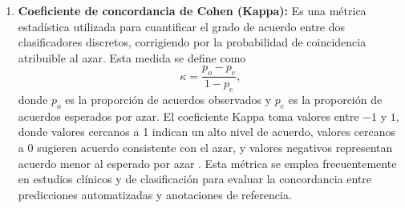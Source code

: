 \begin{enumerate}
    \item \textbf{Coeficiente de concordancia de Cohen (Kappa):} Es una métrica estadística utilizada para cuantificar el grado de acuerdo entre dos clasificadores discretos, corrigiendo por la probabilidad de coincidencia atribuible al azar. Esta medida se define como
    \[
        \kappa = \frac{p_o - p_e}{1 - p_e},
    \]
    donde \(p_o\) es la proporción de acuerdos observados y \(p_e\) es la proporción de acuerdos esperados por azar. El coeficiente Kappa toma valores entre \(-1\) y \(1\), donde valores cercanos a 1 indican un alto nivel de acuerdo, valores cercanos a $0$ sugieren acuerdo consistente con el azar, y valores negativos representan acuerdo menor al esperado por azar \cite{mchugh2012interrater}. Esta métrica se emplea frecuentemente en estudios clínicos y de clasificación para evaluar la concordancia entre predicciones automatizadas y anotaciones de referencia.

\end{enumerate}
